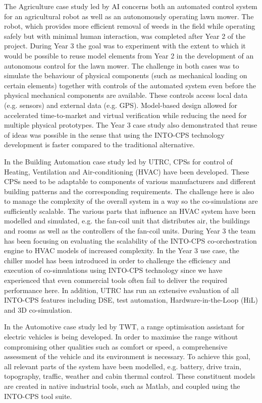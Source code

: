 The Agriculture case study led by AI concerns both an automated control system for an agricultural robot as well as an autonomously operating lawn mower. The robot, which provides more efficient removal of weeds in the field while operating safely but with minimal human interaction, was completed after Year 2 of the project. During Year 3 the goal was to experiment with the extent to which it would be possible to reuse model elements from Year 2 in the development of an autonomous control for the lawn mower. The challenge in both cases was to simulate the behaviour of physical components (such as mechanical loading on certain elements) together with controls of the automated system even before the physical mechanical components are available. These controls access local data (e.g. sensors) and external data (e.g. GPS). Model-based design allowed for accelerated time-to-market and virtual verification while reducing the need for multiple physical prototypes. The Year 3 case study also demonstrated that reuse of ideas was possible in the sense that using the INTO-CPS technology development is faster compared to the traditional alternative.

In the Building Automation case study led by UTRC, CPSs for control of Heating, Ventilation and Air-conditioning (HVAC) have been developed. These CPSs need to be adaptable to components of various manufacturers and different building patterns and the corresponding requirements. The challenge here is also to manage the complexity of the overall system in a way so the co-simulations are sufficiently scalable. The various parts that influence an HVAC system have been modelled and simulated, e.g. the fan-coil unit that distributes air, the buildings and rooms as well as the controllers of the fan-coil units. During Year 3 the team has been focusing on evaluating the scalability of the INTO-CPS co-orchestration engine to HVAC models of increased complexity. In the Year 3 use case, the chiller model has been introduced in order to challenge the efficiency and execution of co-simulations using INTO-CPS technology since we have experienced that even commercial tools often fail to deliver the required performance here. In addition, UTRC has run an extensive evaluation of all INTO-CPS features including DSE, test automation, Hardware-in-the-Loop (HiL) and 3D co-simulation.   

In the Automotive case study led by TWT, a range optimisation assistant for electric vehicles is being developed. In order to maximise the range without compromising other qualities such as comfort or speed, a comprehensive assessment of the vehicle and its environment is necessary. To achieve this goal, all relevant parts of the system have been modelled, e.g. battery, drive train, topography, traffic, weather and cabin thermal control. These constituent models are created in native industrial tools, such as Matlab, and coupled using the INTO-CPS tool suite.

